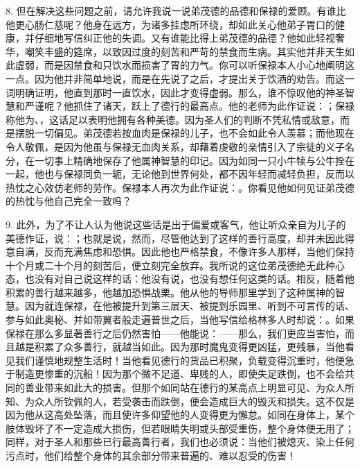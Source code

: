 8. 但在解决这些问题之前，请允许我说一说弟茂德的品德和保禄的爱顾。有谁比他更心肠仁慈呢？他身在远方，为诸多挂虑所环绕，却如此关心他弟子胃口的健康，并仔细地写信纠正他的失调。又有谁能比得上弟茂德的品德？他如此轻视奢华，嘲笑丰盛的筵席，以致因过度的刻苦和严苛的禁食而生病。其实他并非天生如此虚弱，而是因禁食和只饮水而损害了胃的力气。你可以听保禄本人小心地阐明这一点。因为他并非简单地说，而是在先说了之后，才提出关于饮酒的劝告。而这一词明确证明，他直到那时一直饮水，因此才变得虚弱。那么，谁不惊叹他的神圣智慧和严谨呢？他抓住了诸天，跃上了德行的最高点。他的老师为此作证说：；保禄称他为、，这话足以表明他拥有各种美德。因为圣人们的判断不凭私情或敌意，而是摆脱一切偏见。弟茂德若按血肉是保禄的儿子，也不会如此令人羡慕；而他现在令人敬佩，是因为他虽与保禄无血肉关系，却藉着虔敬的亲情引入了宗徒的义子名分，在一切事上精确地保存了他属神智慧的印记。因为如同一只小牛犊与公牛拴在一起，他也与保禄同负一轭，无论他到世界何处，都不因年轻而减轻负担，反而以热忱之心效仿老师的劳作。保禄本人再次为此作证说：。你看见他如何见证弟茂德的热忱与他自己完全一致吗？\par

9. 此外，为了不让人认为他说这些话是出于偏爱或客气，他让听众亲自为儿子的美德作证，说：；也就是说，然而，尽管他达到了这样的善行高度，却并未因此得意自满，反而充满焦虑和恐惧。因此他也严格禁食，不像许多人那样，当他们保持十个月或二十个月的刻苦后，便立刻完全放弃。我所说的这位弟茂德绝无此种心态，也没有对自己说这样的话：他没有说，也没有想任何这类的话。相反，随着他积累的善行越来越多，他越加恐惧战栗。他从他的导师那里学到了这种属神的智慧。因为就连保禄，在他被提升到第三层天、被提到乐园里、听到不可言传的话、参与如此奥秘、并如带翼者般走遍普世之后，当他写信给格林多人时却说：。如果保禄在那么多显著善行之后仍然害怕——他能说：——那么，我们更应当害怕，而且越是积累了众多善行，就越当如此。因为那时魔鬼变得更凶猛，更残暴，当他看见我们谨慎地规整生活时！当他看见德行的货品已积聚，负载变得沉重时，他便急于制造更惨重的沉船！因为那个微不足道、卑贱的人，即使失足跌倒，也不会给共同的善业带来如此大的损害。但那个如同站在德行的某高点上明显可见、为众人所知、为众人所钦佩的人，若受袭击而跌倒，便会造成巨大的毁灭和损失。这不仅是因为他从这高处坠落，而且使许多仰望他的人变得更为懈怠。如同在身体上，某个肢体毁坏了不一定造成大损伤，但若眼睛失明或头部受重伤，整个身体便无用了；同样，对于圣人和那些已行最高善行者，我们也必须说：当他们被熄灭、染上任何污点时，他们给整个身体的其余部分带来普遍的、难以忍受的伤害！\par

